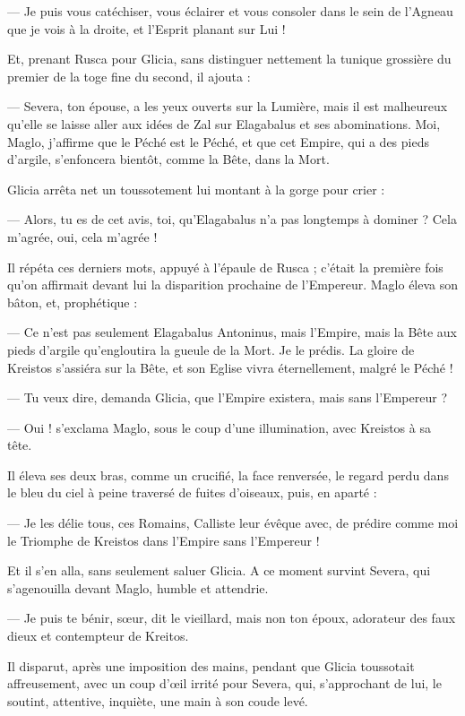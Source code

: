 \documentclass[a4paper, 11pt, oneside, polutonikogreek, french]{article}
\begin{document}
--- Je puis vous catéchiser, vous éclairer et vous consoler dans le sein de l'Agneau que je vois à la droite, et l'Esprit planant sur Lui !

Et, prenant Rusca pour Glicia, sans distinguer nettement la tunique grossière du premier de la toge fine du second, il ajouta :

--- Severa, ton épouse, a les yeux ouverts sur la Lumière, mais il est malheureux qu'elle se laisse aller aux idées de Zal sur Elagabalus et ses abominations. Moi, Maglo, j'affirme que le Péché est le Péché, et que cet Empire, qui a des pieds d'argile, s'enfoncera bientôt, comme la Bête, dans la Mort.

Glicia arrêta net un toussotement lui montant à la gorge pour crier :

--- Alors, tu es de cet avis, toi, qu'Elagabalus n'a pas longtemps à dominer ? Cela m'agrée, oui, cela m'agrée !

Il répéta ces derniers mots, appuyé à l'épaule de Rusca ; c'était la première fois qu'on affirmait devant lui la disparition prochaine de l'Empereur. Maglo éleva son bâton, et, prophétique :

--- Ce n'est pas seulement Elagabalus Antoninus, mais l'Empire, mais la Bête aux pieds d'argile qu'engloutira la gueule de la Mort. Je le prédis. La gloire de Kreistos s'assiéra sur la Bête, et son Eglise vivra éternellement, malgré le Péché !

--- Tu veux dire, demanda Glicia, que l'Empire existera, mais sans l'Empereur ?

--- Oui ! s'exclama Maglo, sous le coup d'une illumination, avec Kreistos à sa tête.

Il éleva ses deux bras, comme un crucifié, la face renversée, le regard perdu dans le bleu du ciel à peine traversé de fuites d'oiseaux, puis, en aparté :

--- Je les délie tous, ces Romains, Calliste leur évêque avec, de prédire comme moi le Triomphe de Kreistos dans l'Empire sans l'Empereur !

Et il s'en alla, sans seulement saluer Glicia. A ce moment survint Severa, qui s'agenouilla devant Maglo, humble et attendrie.

--- Je puis te bénir, sœur, dit le vieillard, mais non ton époux, adorateur des faux dieux et contempteur de Kreitos.

Il disparut, après une imposition des mains, pendant que Glicia toussotait affreusement, avec un coup d'œil irrité pour Severa, qui, s'approchant de lui, le soutint, attentive, inquiète, une main à son coude levé.
\end{document}
